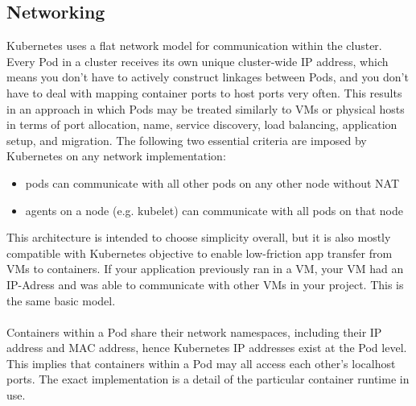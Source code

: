 \subsection{Networking}
Kubernetes uses a flat network model for communication within the cluster. Every Pod in a cluster receives its own unique cluster-wide IP address, which means you don't have to actively construct linkages between Pods, and you don't have to deal with mapping container ports to host ports very often. This results in an approach in which Pods may be treated similarly to VMs or physical hosts in terms of port allocation, name, service discovery, load balancing, application setup, and migration. The following two essential criteria are imposed by Kubernetes on any network implementation: 
\begin{itemize}
    \item pods can communicate with all other pods on any other node without NAT
    \item agents on a node (e.g. kubelet) can communicate with all pods on that node
\end{itemize}

\noindent This architecture is intended to choose simplicity overall, but it is also mostly compatible with Kubernetes objective to enable low-friction app transfer from VMs to containers. If your application previously ran in a VM, your VM had an IP-Adress and was able to communicate with other VMs in your project. This is the same basic model.
\\\\Containers within a Pod share their network namespaces, including their IP address and MAC address, hence Kubernetes IP addresses exist at the Pod level. This implies that containers within a Pod may all access each other's localhost ports. The exact implementation is a detail of the particular container runtime in use.\cite{Kubernetes_network:2022}
